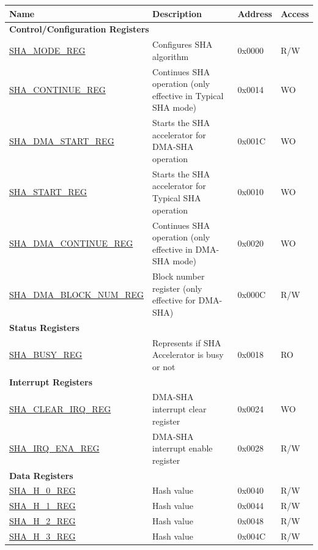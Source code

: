 \begin{longtable}{ | l | l | l |l | }
\hline\rowcolor{lightgray}
\textbf{Name} & \textbf{Description} &  \textbf{Address} & \textbf{Access} \\ \hline
\endhead
\multicolumn{4}{|l|}{\textbf{Control/Configuration Registers}} \\ \hline
\hyperref[regdesc:SHAMODEREG]{SHA\_MODE\_REG} & Configures SHA algorithm & 0x0000 & R/W \\ \hline
\hyperref[regdesc:SHACONTINUEREG]{SHA\_CONTINUE\_REG} & Continues SHA operation (only effective in Typical SHA mode) & 0x0014 & WO \\ \hline
\hyperref[regdesc:SHADMASTARTREG]{SHA\_DMA\_START\_REG} & Starts the SHA accelerator for DMA-SHA operation & 0x001C & WO \\ \hline
\hyperref[regdesc:SHASTARTREG]{SHA\_START\_REG} & Starts the SHA accelerator for Typical SHA operation & 0x0010 & WO \\ \hline
\hyperref[regdesc:SHADMACONTINUEREG]{SHA\_DMA\_CONTINUE\_REG} & Continues SHA operation (only effective in DMA-SHA mode) & 0x0020 & WO \\ \hline
\hyperref[regdesc:SHADMABLOCKNUMREG]{SHA\_DMA\_BLOCK\_NUM\_REG} & Block number register (only effective for DMA-SHA) & 0x000C & R/W \\ \hline
\multicolumn{4}{|l|}{\textbf{Status Registers}} \\ \hline
\hyperref[regdesc:SHABUSYREG]{SHA\_BUSY\_REG} & Represents if SHA Accelerator is busy or not & 0x0018 & RO \\ \hline
\multicolumn{4}{|l|}{\textbf{Interrupt Registers}} \\ \hline
\hyperref[regdesc:SHACLEARIRQREG]{SHA\_CLEAR\_IRQ\_REG} & DMA-SHA interrupt clear register & 0x0024 & WO \\ \hline
\hyperref[regdesc:SHAIRQENAREG]{SHA\_IRQ\_ENA\_REG} & DMA-SHA interrupt enable register & 0x0028 & R/W \\ \hline
\multicolumn{4}{|l|}{\textbf{Data Registers}} \\ \hline
\hyperref[regdesc:SHAHNREG]{SHA\_H\_0\_REG} & Hash value & 0x0040 & R/W \\ \hline
\hyperref[regdesc:SHAHNREG]{SHA\_H\_1\_REG} & Hash value & 0x0044 & R/W \\ \hline
\hyperref[regdesc:SHAHNREG]{SHA\_H\_2\_REG} & Hash value & 0x0048 & R/W \\ \hline
\hyperref[regdesc:SHAHNREG]{SHA\_H\_3\_REG} & Hash value & 0x004C & R/W \\ \hline

\end{longtable}
